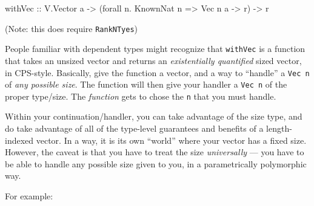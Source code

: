 \documentclass[]{article}
\newenvironment{Shaded}{}{}
\newcommand{\KeywordTok}[1]{\textcolor[rgb]{0.00,0.44,0.13}{\textbf{#1}}}
\newcommand{\DataTypeTok}[1]{\textcolor[rgb]{0.56,0.13,0.00}{#1}}
\newcommand{\DecValTok}[1]{\textcolor[rgb]{0.25,0.63,0.44}{#1}}
\newcommand{\CommentTok}[1]{\textcolor[rgb]{0.38,0.63,0.69}{\textit{#1}}}
\newcommand{\OtherTok}[1]{\textcolor[rgb]{0.00,0.44,0.13}{#1}}
\newcommand{\FunctionTok}[1]{\textcolor[rgb]{0.02,0.16,0.49}{#1}}
\newcommand{\NormalTok}[1]{#1}
\begin{document}
\begin{Shaded}
\begin{Highlighting}[]
\NormalTok{withVec}
\OtherTok{    ::} \DataTypeTok{V.Vector}\NormalTok{ a}
    \OtherTok{->}\NormalTok{ (forall n}\FunctionTok{.} \DataTypeTok{KnownNat}\NormalTok{ n }\OtherTok{=>} \DataTypeTok{Vec}\NormalTok{ n a }\OtherTok{->}\NormalTok{ r)}
    \OtherTok{->}\NormalTok{ r}
\end{Highlighting}
\end{Shaded}

(Note: this does require \texttt{RankNTyes})

People familiar with dependent types might recognize that \texttt{withVec} is a
function that takes an unsized vector and returns an \emph{existentially
quantified} sized vector, in CPS-style. Basically, give the function a vector,
and a way to ``handle'' a \texttt{Vec\ n} of \emph{any possible size}. The
function will then give your handler a \texttt{Vec\ n} of the proper type/size.
The \emph{function} gets to chose the \texttt{n} that you must handle.

Within your continuation/handler, you can take advantage of the size type, and
do take advantage of all of the type-level guarantees and benefits of a
length-indexed vector. In a way, it is its own ``world'' where your vector has a
fixed size. However, the caveat is that you have to treat the size
\emph{universally} --- you have to be able to handle any possible size given to
you, in a parametrically polymorphic way.

For example:

\begin{Shaded}
\end{Shaded}
\end{document}
